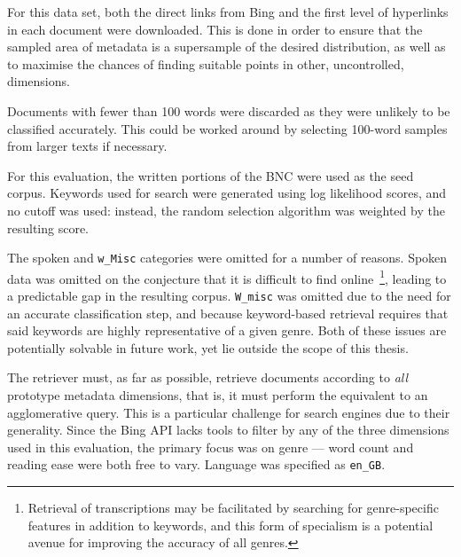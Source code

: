 For this data set, both the direct links from Bing and the first level of hyperlinks in each document were downloaded.  This is done in order to ensure that the sampled area of metadata is a supersample of the desired distribution, as well as to maximise the chances of finding suitable points in other, uncontrolled, dimensions.

Documents with fewer than 100 words were discarded as they were unlikely to be classified accurately.  This could be worked around by selecting 100-word samples from larger texts if necessary.

For this evaluation, the written portions of the BNC were used as the seed corpus.  Keywords used for search were generated using log likelihood scores, and no cutoff was used: instead, the random selection algorithm was weighted by the resulting score.

The spoken and \texttt{w\_Misc} categories were omitted for a number of reasons.  Spoken data was omitted on the conjecture that it is difficult to find online~\footnote{Retrieval of transcriptions may be facilitated by searching for genre-specific features in addition to keywords, and this form of specialism is a potential avenue for improving the accuracy of all genres.}, leading to a predictable gap in the resulting corpus.  \texttt{W\_misc} was omitted due to the need for an accurate classification step, and because keyword-based retrieval requires that said keywords are highly representative of a given genre.  Both of these issues are potentially solvable in future work, yet lie outside the scope of this thesis.


The retriever must, as far as possible, retrieve documents according to \textsl{all} prototype metadata dimensions, that is, it must perform the equivalent to an agglomerative query.  This is a particular challenge for search engines due to their generality.  Since the Bing API lacks tools to filter by any of the three dimensions used in this evaluation, the primary focus was on genre --- word count and reading ease were both free to vary.  Language was specified as \texttt{en\_GB}.











